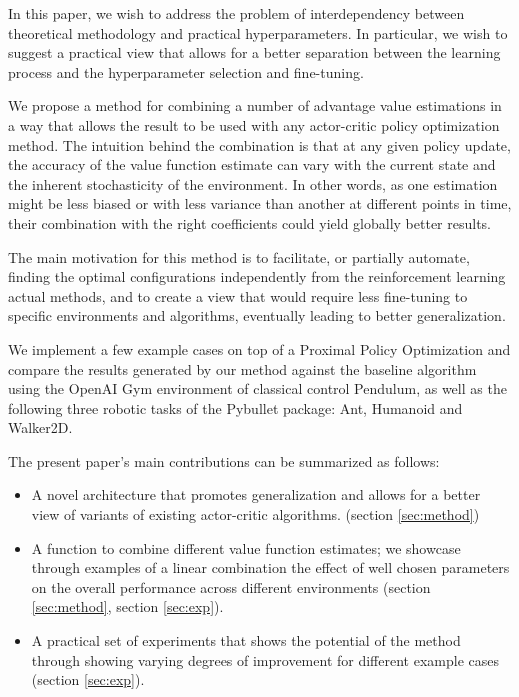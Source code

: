 In this paper, we wish to address the problem of interdependency between theoretical methodology and practical hyperparameters. In particular, we wish to suggest a practical view that allows for a better separation between the learning process and the hyperparameter selection and fine-tuning. 

We propose a method for combining a number of advantage value estimations in a way that allows the result to be used with any actor-critic policy optimization method. The intuition behind the combination is that at any given policy update, the accuracy of the value function estimate can vary with the current state and the inherent stochasticity of the environment. In other words, as one estimation might be less biased or with less variance than another at different points in time, their combination with the right coefficients could yield globally better results. 

The main motivation for this method is to facilitate, or partially automate, finding the optimal configurations independently from the reinforcement learning actual methods, and to create a view that would require less fine-tuning to specific environments and algorithms, eventually leading to better generalization.

We implement a few example cases on top of a Proximal Policy Optimization\cite{schulman2017proximal} and compare the results generated by our method against the baseline algorithm using the OpenAI Gym environment of classical control Pendulum, as well as the following three robotic tasks of the Pybullet package: Ant, Humanoid and Walker2D.

The present paper's main contributions can be summarized as follows:
\begin{itemize}
\item A novel architecture that promotes generalization and allows for a better view of variants of existing actor-critic algorithms. (section \ref{sec:method})
\item A function to combine different value function estimates; we showcase through examples of a linear combination the effect of well chosen parameters on the overall performance across different environments (section \ref{sec:method}, section \ref{sec:exp}).
\item A practical set of experiments that shows the potential of the method through showing varying degrees of improvement for different example cases (section \ref{sec:exp}). 
\end{itemize}


